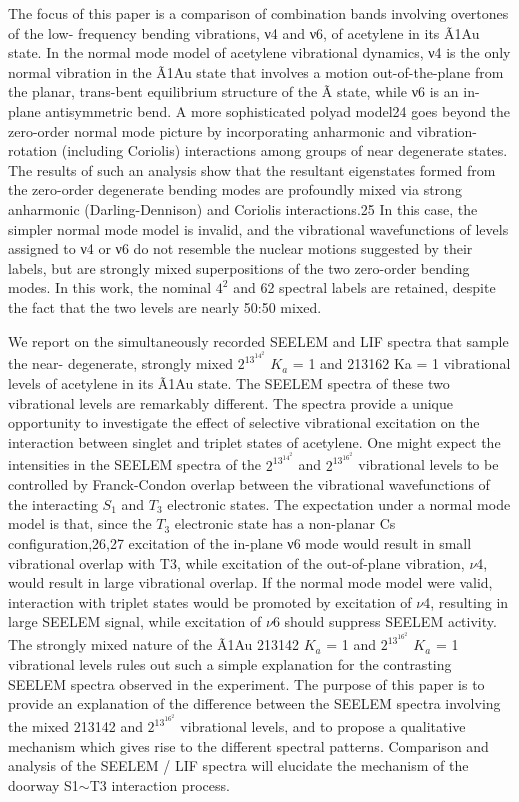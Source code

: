 \documentclass[12pt]{mitthesis}
\begin{document}
The focus of this paper is a comparison of combination bands involving
overtones of the low- frequency bending vibrations, ν4 and ν6, of
acetylene in its Ã1Au state. In the normal mode model of acetylene
vibrational dynamics, ν4 is the only normal vibration in the Ã1Au
state that involves a motion out-of-the-plane from the planar,
trans-bent equilibrium structure of the Ã state, while ν6 is an
in-plane antisymmetric bend. A more sophisticated polyad model24 goes
beyond the zero-order normal mode picture by incorporating anharmonic
and vibration-rotation (including Coriolis) interactions among groups
of near degenerate states. The results of such an analysis show that
the resultant eigenstates formed from the zero-order degenerate
bending modes are profoundly mixed via strong anharmonic
(Darling-Dennison) and Coriolis interactions.25 In this case, the
simpler normal mode model is invalid, and the vibrational
wavefunctions of levels assigned to ν4 or ν6 do not resemble the
nuclear motions suggested by their labels, but are strongly mixed
superpositions of the two zero-order bending modes.  In this work, the
nominal $4^2$ and 62 spectral labels are retained, despite the fact that
the two levels are nearly 50:50 mixed.

We report on the simultaneously recorded SEELEM and LIF spectra that
sample the near- degenerate, strongly mixed $2^13^14^2$ $K_a$ = 1 and 213162
Ka = 1 vibrational levels of acetylene in its Ã1Au state. The SEELEM
spectra of these two vibrational levels are remarkably different. The
spectra provide a unique opportunity to investigate the effect of
selective vibrational excitation on the interaction between singlet
and triplet states of acetylene. One might expect the intensities in
the SEELEM spectra of the $2^13^14^2$ and $2^13^16^2$ vibrational levels to be
controlled by Franck-Condon overlap between the vibrational
wavefunctions of the interacting $S_1$ and $T_3$ electronic states. The
expectation under a normal mode model is that, since the $T_3$ electronic
state has a non-planar Cs configuration,26,27 excitation of the
in-plane ν6 mode would result in small vibrational overlap with T3,
while excitation of the out-of-plane vibration, $\nu$4, would result in
large vibrational overlap. If the normal mode model were valid,
interaction with triplet states would be promoted by excitation
of $\nu$4, resulting in large SEELEM signal, while excitation of $\nu$6
should suppress SEELEM activity. The strongly mixed nature of the Ã1Au
213142 $K_a$ = 1 and $2^13^16^2$ $K_a$ = 1 vibrational levels rules out such a
simple explanation for the contrasting SEELEM spectra observed in the
experiment. The purpose of this paper is to provide an explanation of
the difference between the SEELEM spectra involving the mixed 213142
and $2^13^16^2$ vibrational levels, and to propose a qualitative mechanism
which gives rise to the different spectral patterns. Comparison and
analysis of the SEELEM / LIF spectra will elucidate the mechanism of
the doorway S1$\sim$T3 interaction process.
\end{document}

